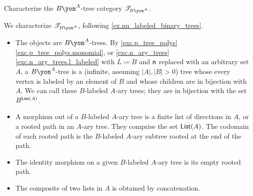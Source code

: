 \documentclass[Book-Poly]{subfiles}
\begin{document}
\begin{exercise} \label{exc.b-lab_a-ary_trees}
Characterize the $B\yon^A$-tree category $\cofree{B\yon^A}$.
\begin{solution}
We characterize $\cofree{B\yon^A}$, following \cref{ex.nn_labeled_binary_trees}.
\begin{itemize}
    \item The objects are $B\yon^A$-trees.
    By \cref{exc.p_tree_polys} \cref{exc.p_tree_polys.monomial}, or \cref{exc.n_ary_trees} \cref{exc.n_ary_trees.l_labeled} with $L\coloneqq B$ and $\mathsf{n}$ replaced with an arbitrary set $A$, a $B\yon^A$-tree is a (infinite, assuming $|A|,|B|>0$) tree whose every vertex is labeled by an element of $B$ and whose children are in bijection with $A$.
    We can call these $B$-labeled $A$-ary trees; they are in bijection with the set $B^{\mathsf{List}(A)}$.
    \item A morphism out of a $B$-labeled $A$-ary tree is a finite list of directions in $A$, or a rooted path in an $A$-ary tree.
    They comprise the set $\mathsf{List}(A)$.
    The codomain of each rooted path is the $B$-labeled $A$-ary subtree rooted at the end of the path.
    \item The identity morphism on a given $B$-labeled $A$-ary tree is its empty rooted path.
    \item The composite of two lists in $A$ is obtained by concatenation.
\end{itemize}
\end{solution}
\end{exercise}
\end{document}
